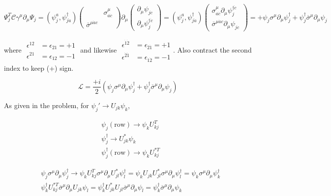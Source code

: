 \documentclass[twoside]{amsart}
\begin{document}
\begin{itemize}
\[
\Psi_j^T \mathcal{C} \gamma^{\mu} \partial_{\mu} \Psi_j = ( \psi_j^a, \psi_{j \dot{a}}^{\dag} ) \left( \begin{matrix} & \sigma^{\mu}_{ a \dot{c}} \\ \overline{\sigma}^{\mu \dot{a} c} & \end{matrix} \right) \partial_{\mu} \left( \begin{matrix} \partial_{\mu} \psi_{jc} \\ \partial_{\mu} \psi_j^{\dag \dot{c}} \end{matrix} \right) =   ( \psi_j^a, \psi_{j \dot{a}}^{\dag} ) \left( \begin{matrix} \sigma^{\mu}_{a \dot{c}} \partial_{\mu} \psi_j^{\dag \dot{c}} \\ \overline{\sigma}^{\mu \dot{a} c} \partial_{\mu} \psi_{jc} \end{matrix} \right) = + \psi_j \sigma^{\mu} \partial_{\mu} \psi_j^{\dag} + \psi_j^{\dag} \overline{\sigma}^{\mu} \partial_{\mu} \psi_j
\]

where $\begin{aligned} \epsilon^{12} & = \epsilon_{21} = + 1 \\  \epsilon^{21} & = \epsilon_{12} = - 1 \end{aligned}$ and likewise $\begin{aligned} \epsilon^{\dot{1}\dot{2}} & = \epsilon_{\dot{2}\dot{1}} = + 1 \\  \epsilon^{\dot{2}\dot{1}} & = \epsilon_{\dot{1}\dot{2}} = - 1 \end{aligned}$.  Also contract the second index to keep (+) sign.  

\[
\mathcal{L} = \frac{+i}{2} ( \psi_j \sigma^{\mu}  \partial_{\mu} \psi_j^{\dag} + \psi_j^{\dag} \overline{\sigma}^{\mu} \partial_{\mu} \psi_j )
\]

As given in the problem, for $\psi_j' \to U_{jk} \psi_k$, 

\[
\begin{aligned}
  & \psi_j(\text{row}) \to \psi_k U_{kj}^T \\ 
  & \psi_j^{\dag} \to U_{jk}^* \psi_k \\ 
  & \psi_j^{\dag}(\text{row}) \to \psi_k U_{kj}^{* T} 
\end{aligned}
\]

\[
\begin{aligned}
  & \psi_j \sigma^{\mu} \partial_{\mu} \psi_j^{\dag} \to \psi_k U_{kj}^T  \sigma^{\mu} \partial_{\mu} U_{jl}^* \psi_l^{\dag} = \psi_k U_{jk} U_{jl}^* \sigma^{\mu} \partial_{\mu} \psi_l^{\dag} = \psi_k \sigma^{\mu} \partial_{\mu} \psi_k^{\dag} \\ 
  & \psi^{\dag}_k U_{kj}^{* T} \overline{\sigma}^{\mu} \partial_{\mu} U_{jk} \psi_l = \psi^{\dag}_k U_{jk}^* U_{jl} \overline{\sigma}^{\mu} \partial_{\mu} \psi_l = \psi^{\dag}_k \overline{\sigma}^{\mu} \partial_{\mu} \psi_k 
\end{aligned}
\]


\end{itemize}
\end{document}
